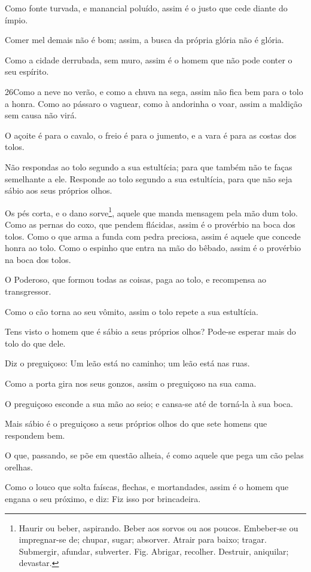 Como fonte turvada, e manancial poluído, assim é o justo que cede
diante do ímpio.

Comer mel demais não é bom; assim, a busca da própria glória não
é glória.

Como a cidade derrubada, sem muro, assim é o homem que não pode
conter o seu espírito.

\medskip

\lettrine{26}{}Como a neve no verão, e como a chuva na sega,
assim não fica bem para o tolo a honra.  Como ao
pássaro o vaguear, como à andorinha o voar, assim a maldição sem
causa não virá.

O açoite é para o cavalo, o freio é para o jumento, e a vara é
para as costas dos tolos.

Não respondas ao tolo segundo a sua estultícia; para que também
não te faças semelhante a ele. Responde ao tolo segundo a sua
estultícia, para que não seja sábio aos seus próprios olhos.

Os pés corta, e o dano sorve\footnote{Haurir ou beber, aspirando.
Beber aos sorvos ou aos poucos. Embeber-se ou impregnar-se de;
chupar, sugar; absorver. Atrair para baixo; tragar. Submergir,
afundar, subverter. Fig. Abrigar, recolher. Destruir, aniquilar;
devastar.}, aquele que manda mensagem pela mão dum tolo. Como as
pernas do coxo, que pendem flácidas, assim é o provérbio na boca dos
tolos. Como o que arma a funda com pedra preciosa, assim é
aquele que concede honra ao tolo. Como o espinho que entra na
mão do bêbado, assim é o provérbio na boca dos tolos.

O Poderoso, que formou todas as coisas, paga ao tolo, e
recompensa ao transgressor.

Como o cão torna ao seu vômito, assim o tolo repete a sua
estultícia.

Tens visto o homem que é sábio a seus próprios olhos? Pode-se
esperar mais do tolo do que dele.

Diz o preguiçoso: Um leão está no caminho; um leão está nas ruas.

Como a porta gira nos seus gonzos, assim o preguiçoso na sua
cama.

O preguiçoso esconde a sua mão ao seio; e cansa-se até de
torná-la à sua boca.

Mais sábio é o preguiçoso a seus próprios olhos do que sete
homens que respondem bem.

O que, passando, se põe em questão alheia, é como aquele que pega
um cão pelas orelhas.

Como o louco que solta faíscas, flechas, e mortandades,
assim é o homem que engana o seu próximo, e diz: Fiz isso por
brincadeira.

